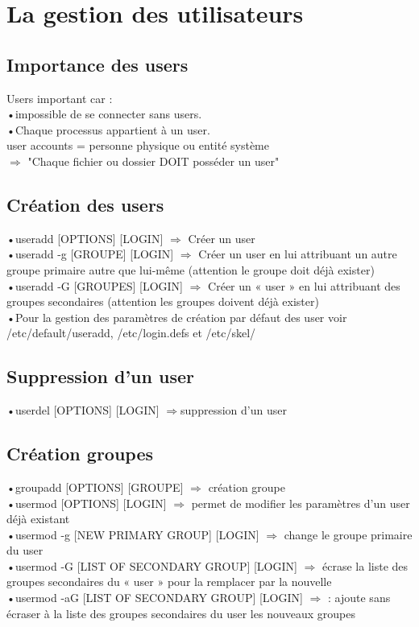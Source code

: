 \documentclass[a4paper, 11pt, french, oneside]{book}
\begin{document}
	\chapter{La gestion des utilisateurs}
		\section{Importance des users} 
		    Users important car : \\
		   	•impossible de se connecter sans users. \\
			•Chaque processus appartient à un user. \\
			user accounts = personne physique ou entité système\\
			$\Rightarrow$ "Chaque fichier ou dossier DOIT posséder un user"
		\section{Création des users}
			•{\color{red}useradd [OPTIONS] [LOGIN]} $\Rightarrow$ Créer un user \\
			•{\color{red}useradd -g [GROUPE] [LOGIN] } $\Rightarrow$ Créer un user en lui attribuant un autre groupe primaire autre que lui-même (attention le groupe doit déjà exister)\\
			•{\color{red}useradd -G [GROUPES] [LOGIN]} $\Rightarrow$ Créer un « user » en lui attribuant des groupes secondaires  (attention les groupes doivent déjà exister)\\
			•Pour la gestion des paramètres de création par défaut des user voir {\color{blue}/etc/default/useradd}, {\color{blue}/etc/login.defs} et {\color{blue} /etc/skel/}
		\section{Suppression d'un user}
			•{\color{red}userdel [OPTIONS] [LOGIN]} $\Rightarrow$suppression d’un user
			\pagebreak 
		\section{Création groupes}
			•{\color{red}groupadd [OPTIONS] [GROUPE]} $\Rightarrow$ création groupe\\
			•{\color{red}usermod [OPTIONS] [LOGIN]} $\Rightarrow$ permet de modifier les paramètres d’un user déjà existant\\
			•{\color{red}usermod -g [NEW PRIMARY GROUP] [LOGIN]} $\Rightarrow$ change le groupe primaire du user\\
			•{\color{red}usermod -G [LIST OF SECONDARY GROUP] [LOGIN]} $\Rightarrow$ écrase la liste des groupes secondaires du « user » pour la remplacer par la nouvelle\\
			•{\color{red}usermod -aG [LIST OF SECONDARY GROUP] [LOGIN]} $\Rightarrow$ : ajoute sans écraser à la liste des groupes secondaires du user les nouveaux groupes
\end{document}
